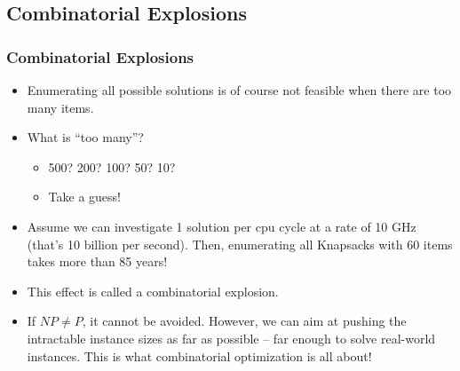 \documentclass{beamer}
\begin{document}
\subsection{Combinatorial Explosions}
\begin{frame}
	\frametitle{Combinatorial Explosions}
	\begin{itemize}
	\item  Enumerating all possible solutions is of course not feasible
	when there are too many items.
	\item  What is “too many”?
	\begin{itemize}
	\item  500? 200? 100? 50? 10?
	\item Take a guess!
	\end{itemize}
	\item  Assume we can investigate 1 solution per cpu cycle at a
	rate of 10 GHz (that’s 10 billion per second). Then,
	enumerating all Knapsacks with 60 items takes more than
	85 years!
	\end{itemize}
\end{frame}
\begin{frame}
	\begin{itemize}
		\item This effect is called a combinatorial explosion.
	\item If $NP \neq P$, it cannot be avoided. However, we can aim at
pushing the intractable instance sizes as far as possible – far enough to solve real-world instances. This is what
combinatorial optimization is all about!
\end{itemize}
\end{frame}
\end{document}
